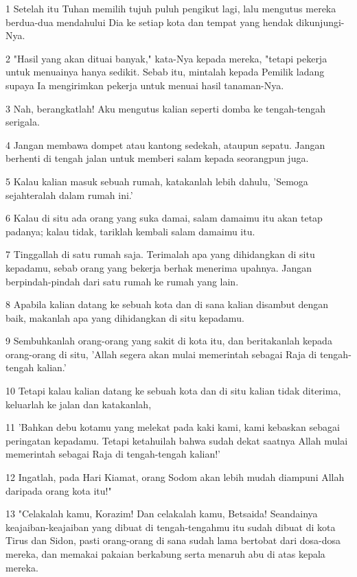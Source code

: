 \par 1 Setelah itu Tuhan memilih tujuh puluh pengikut lagi, lalu mengutus mereka berdua-dua mendahului Dia ke setiap kota dan tempat yang hendak dikunjungi-Nya.
\par 2 "Hasil yang akan dituai banyak," kata-Nya kepada mereka, "tetapi pekerja untuk menuainya hanya sedikit. Sebab itu, mintalah kepada Pemilik ladang supaya Ia mengirimkan pekerja untuk menuai hasil tanaman-Nya.
\par 3 Nah, berangkatlah! Aku mengutus kalian seperti domba ke tengah-tengah serigala.
\par 4 Jangan membawa dompet atau kantong sedekah, ataupun sepatu. Jangan berhenti di tengah jalan untuk memberi salam kepada seorangpun juga.
\par 5 Kalau kalian masuk sebuah rumah, katakanlah lebih dahulu, 'Semoga sejahteralah dalam rumah ini.'
\par 6 Kalau di situ ada orang yang suka damai, salam damaimu itu akan tetap padanya; kalau tidak, tariklah kembali salam damaimu itu.
\par 7 Tinggallah di satu rumah saja. Terimalah apa yang dihidangkan di situ kepadamu, sebab orang yang bekerja berhak menerima upahnya. Jangan berpindah-pindah dari satu rumah ke rumah yang lain.
\par 8 Apabila kalian datang ke sebuah kota dan di sana kalian disambut dengan baik, makanlah apa yang dihidangkan di situ kepadamu.
\par 9 Sembuhkanlah orang-orang yang sakit di kota itu, dan beritakanlah kepada orang-orang di situ, 'Allah segera akan mulai memerintah sebagai Raja di tengah-tengah kalian.'
\par 10 Tetapi kalau kalian datang ke sebuah kota dan di situ kalian tidak diterima, keluarlah ke jalan dan katakanlah,
\par 11 'Bahkan debu kotamu yang melekat pada kaki kami, kami kebaskan sebagai peringatan kepadamu. Tetapi ketahuilah bahwa sudah dekat saatnya Allah mulai memerintah sebagai Raja di tengah-tengah kalian!'
\par 12 Ingatlah, pada Hari Kiamat, orang Sodom akan lebih mudah diampuni Allah daripada orang kota itu!"
\par 13 "Celakalah kamu, Korazim! Dan celakalah kamu, Betsaida! Seandainya keajaiban-keajaiban yang dibuat di tengah-tengahmu itu sudah dibuat di kota Tirus dan Sidon, pasti orang-orang di sana sudah lama bertobat dari dosa-dosa mereka, dan memakai pakaian berkabung serta menaruh abu di atas kepala mereka.

